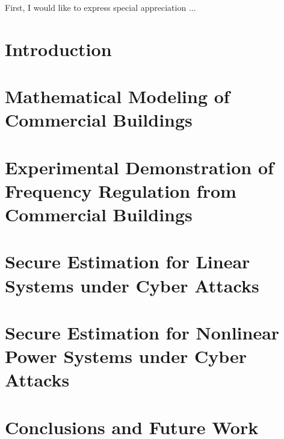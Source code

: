 \documentclass[12pt, oneside, final]{lib/ucthesis}
\def\ssp{\def\baselinestretch{1.0}\large\normalsize}
\begin{document}
\tableofcontents

\begin{acknowledgements}
\thispagestyle{plain}

First, I would like to express special appreciation ...

\end{acknowledgements}




\begin{dissertationText}
\chapter{Introduction \label{chapter:intro}}
%	
\chapter{Mathematical Modeling of Commercial Buildings \label{chapter:building_model}}
	
\chapter{Experimental Demonstration of Frequency Regulation from Commercial Buildings \label{chapter:building_exp}}
	
\chapter{Secure Estimation for Linear Systems under Cyber Attacks \label{chapter:se_linear}}
	
\chapter{Secure Estimation for Nonlinear Power Systems under Cyber Attacks \label{chapter:se_nonlinear}}
	
\chapter{Conclusions and Future Work \label{chapter:conclusions}}
%  



\ssp	%



%	

\end{dissertationText}
\end{document}

